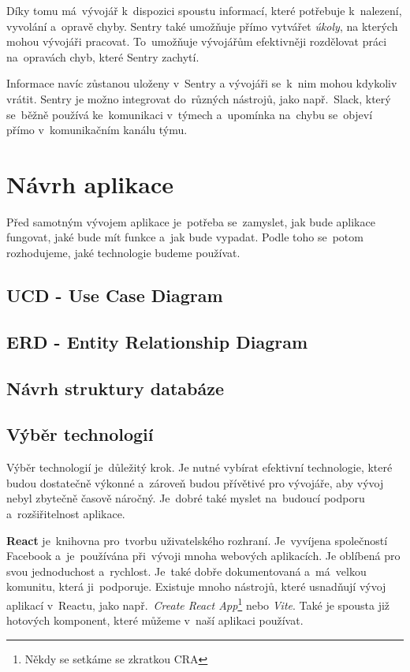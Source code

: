\documentclass[14pt]{article}
\begin{document}
            Díky tomu má~vývojář k~dispozici spoustu informací, které potřebuje k~nalezení, vyvolání a~opravě chyby.
            Sentry také umožňuje přímo vytvářet \emph{úkoly}, na kterých mohou vývojáři pracovat.
            To~umožňuje vývojářům efektivněji rozdělovat práci na~opravách chyb, které Sentry zachytí.

            Informace navíc zůstanou uloženy v~Sentry a vývojáři se~k~nim mohou kdykoliv vrátit.
            Sentry je možno integrovat do~různých nástrojů, jako např.~Slack, který se~běžně používá ke~komunikaci v~týmech
            a~upomínka na~chybu se~objeví přímo v~komunikačním kanálu týmu.
	
	\section{Návrh aplikace}
        Před samotným vývojem aplikace je~potřeba se~zamyslet, jak bude aplikace fungovat, jaké bude mít funkce a~jak bude vypadat. Podle toho se~potom rozhodujeme, jaké technologie budeme používat.

        \subsection{UCD - Use Case Diagram}
        \subsection{ERD - Entity Relationship Diagram}
        \subsection{Návrh struktury databáze}
        \subsection{Výběr technologií}
            Výběr technologií je~důležitý krok. Je nutné vybírat efektivní technologie, které budou dostatečně výkonné a~zároveň budou
            přívětivé pro vývojáře, aby vývoj nebyl zbytečně časově náročný. Je~dobré také myslet na~budoucí podporu a~rozšiřitelnost aplikace.

            \textbf{React} je~knihovna pro~tvorbu uživatelského rozhraní. Je~vyvíjena společností Facebook a~je~používána při~vývoji mnoha webových aplikacích.
            Je oblíbená pro svou jednoduchost a~rychlost. Je~také dobře dokumentovaná a~má~velkou komunitu, která ji~podporuje.
            Existuje mnoho nástrojů, které usnadňují vývoj aplikací v~Reactu, jako
            např.~\emph{Create React App}\footnote{Někdy se setkáme se zkratkou CRA} nebo \emph{Vite}.
            Také je spousta již hotových komponent, které můžeme v~naší aplikaci používat.
\end{document}
